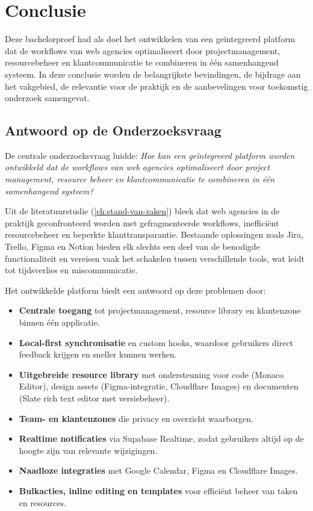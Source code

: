
\chapter{Conclusie}%
\label{ch:conclusie}

Deze bachelorproef had als doel het ontwikkelen van een geïntegreerd platform dat de workflows van web agencies optimaliseert door projectmanagement, resourcebeheer en klantcommunicatie te combineren in één samenhangend systeem. In deze conclusie worden de belangrijkste bevindingen, de bijdrage aan het vakgebied, de relevantie voor de praktijk en de aanbevelingen voor toekomstig onderzoek samengevat.

\section{Antwoord op de Onderzoeksvraag}

De centrale onderzoeksvraag luidde: \emph{Hoe kan een geïntegreerd platform worden ontwikkeld dat de workflows van web agencies optimaliseert door project management, resource beheer en klantcommunicatie te combineren in één samenhangend systeem?}

Uit de literatuurstudie (\autoref{ch:stand-van-zaken}) bleek dat web agencies in de praktijk geconfronteerd worden met gefragmenteerde workflows, inefficiënt resourcebeheer en beperkte klanttransparantie. Bestaande oplossingen zoals Jira, Trello, Figma en Notion bieden elk slechts een deel van de benodigde functionaliteit en vereisen vaak het schakelen tussen verschillende tools, wat leidt tot tijdsverlies en miscommunicatie.

Het ontwikkelde platform biedt een antwoord op deze problemen door:
\begin{itemize}
    \item \textbf{Centrale toegang} tot projectmanagement, resource library en klantenzone binnen één applicatie.
    \item \textbf{Local-first synchronisatie} en custom hooks, waardoor gebruikers direct feedback krijgen en sneller kunnen werken.
    \item \textbf{Uitgebreide resource library} met ondersteuning voor code (Monaco Editor), design assets (Figma-integratie, Cloudflare Images) en documenten (Slate rich text editor met versiebeheer).
    \item \textbf{Team- en klantenzones} die privacy en overzicht waarborgen.
    \item \textbf{Realtime notificaties} via Supabase Realtime, zodat gebruikers altijd op de hoogte zijn van relevante wijzigingen.
    \item \textbf{Naadloze integraties} met Google Calendar, Figma en Cloudflare Images.
    \item \textbf{Bulkacties, inline editing en templates} voor efficiënt beheer van taken en resources.
\end{itemize}

